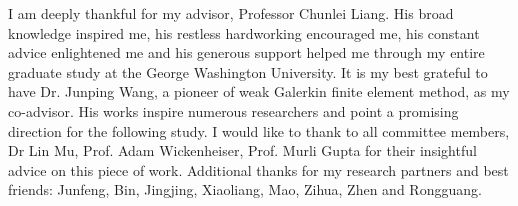 \begin{acknowledgements}

I am deeply thankful for my advisor, Professor Chunlei Liang. His broad knowledge inspired me, his restless hardworking  encouraged me, his constant advice enlightened me and his generous support helped me through my entire graduate study at the George Washington University. It is my best grateful to have Dr. Junping Wang, a pioneer of weak Galerkin finite element method, as my co-advisor. His works inspire numerous researchers and point a promising direction for the following study. I would like to thank to all committee members, Dr Lin Mu, Prof. Adam Wickenheiser, Prof. Murli Gupta for their insightful advice on this piece of work. Additional thanks for my research partners and best friends: Junfeng, Bin, Jingjing, Xiaoliang, Mao, Zihua, Zhen and Rongguang.

\end{acknowledgements}

